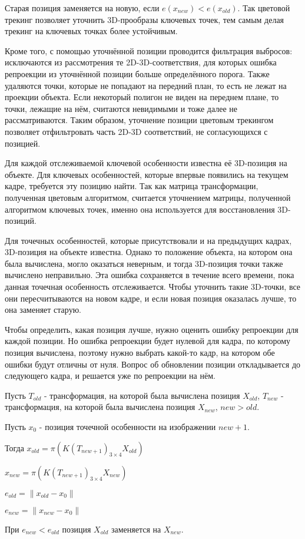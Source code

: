 Старая позиция заменяется на новую, если $e(x_{new}) < e(x_{old})$.
Так цветовой трекинг позволяет уточнить 3D-прообразы ключевых точек, тем самым
делая трекинг на ключевых точках более устойчивым.

Кроме того, с помощью уточнённой позиции проводится фильтрация выбросов:
исключаются из рассмотрения те 2D-3D-соответствия, для которых ошибка
репроекции из уточнённой позиции больше определённого порога.
Также удаляются точки, которые не попадают на передний план, то есть не лежат
на проекции объекта.
Если некоторый полигон не виден на переднем плане, то точки, лежащие на нём,
считаются невидимыми и тоже далее не рассматриваются.
Таким образом, уточнение позиции цветовым трекингом позволяет отфильтровать
часть 2D-3D соответствий, не согласующихся с позицией.


Для каждой отслеживаемой ключевой особенности известна её 3D-позиция на
объекте.
Для ключевых особенностей, которые впервые появились на текущем кадре,
требуется эту позицию найти.
Так как матрица трансформации, полученная цветовым алгоритмом, считается
уточнением матрицы, полученной алгоритмом ключевых точек, именно она
используется для восстановления 3D-позиций.


Для точечных особенностей, которые присутствовали и на предыдущих кадрах,
3D-позиция на объекте известна.
Однако то положение объекта, на котором она была вычислена, могло оказаться
неверным, и тогда 3D-позиция точки также вычислено неправильно.
Эта ошибка сохраняется в течение всего времени, пока данная точечная
особенность отслеживается.
Чтобы уточнить такие 3D-точки, все они пересчитываются на новом кадре, и если
новая позиция оказалась лучше, то она заменяет старую.

Чтобы определить, какая позиция лучше, нужно оценить ошибку репроекции для
каждой позиции.
Но ошибка репроекции будет нулевой для кадра, по которому позиция вычислена,
поэтому нужно выбрать какой-то кадр, на котором обе ошибки будут отличны от
нуля.
Вопрос об обновлении позиции откладывается до следующего кадра, и решается уже
по репроекции на нём.

Пусть $T_{old}$ - трансформация, на которой была вычислена позиция $X_{old}$,
$T_{new}$ - трансформация, на которой была вычислена позиция
$X_{new}$, $new > old$.

Пусть $x_0$ - позиция точечной особенности на изображении $new + 1$. 

Тогда $x_{old} = \pi (K (T_{new + 1})_{3 \times 4} X_{old})$

$x_{new} = \pi (K (T_{new + 1})_{3 \times 4} X_{new})$

$e_{old} = \| x_{old} - x_0 \|$

$e_{new} = \| x_{new} - x_0 \|$

При $e_{new} < e_{old}$ позиция $X_{old}$ заменяется на $X_{new}$.
